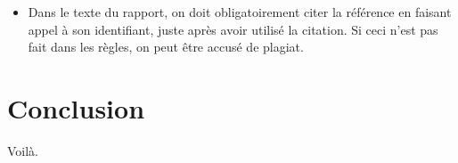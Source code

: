 \begin{spacing}{1.2}
\begin{itemize}
\begin{itemize}
\begin{description}
[en ligne]. Université du Michigan, Etats Unis. Site disponible sur :\\
http://www.lib.umich.edu/megasite/critlist.html.(Page consultée le 11/09/1998).
\end{description}
\item Dans le texte du rapport, on doit obligatoirement citer la référence en  faisant appel à son identifiant, juste après avoir utilisé la citation. Si ceci n'est pas fait dans les règles, on peut être accusé de plagiat.
\end{itemize} 
\end{itemize} 

\section*{Conclusion}
Voilà.

\end{spacing}
